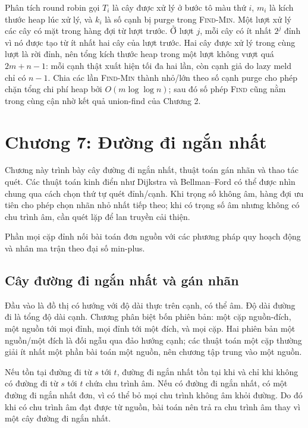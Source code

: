 \documentclass[11pt]{article}
\begin{document}
Phân tích round robin gọi \(T_i\) là cây được xử lý ở bước tô màu thứ \(i\),
\(m_i\) là kích thước heap lúc xử lý, và \(k_i\) là số cạnh bị purge trong
\textsc{Find-Min}. Một lượt xử lý các cây có mặt trong hàng đợi từ lượt trước.
Ở lượt \(j\), mỗi cây có ít nhất \(2^j\) đỉnh vì nó được tạo từ ít nhất hai cây
của lượt trước. Hai cây được xử lý trong cùng lượt là rời đỉnh, nên tổng kích
thước heap trong một lượt không vượt quá \(2m+n-1\): mỗi cạnh thật xuất hiện
tối đa hai lần, còn cạnh giả do lazy meld chỉ có \(n-1\). Chia các lần
\textsc{Find-Min} thành nhỏ/lớn theo số cạnh purge cho phép chặn tổng chi phí
heap bởi \(O(m\log\log n)\); sau đó số phép \textsc{Find} cũng nằm trong cùng
cận nhờ kết quả union-find của Chương 2.

\section{Chương 7: Đường đi ngắn nhất}

Chương này trình bày cây đường đi ngắn nhất, thuật toán gán nhãn và thao tác
quét. Các thuật toán kinh điển như Dijkstra và Bellman--Ford có thể được nhìn
chung qua cách chọn thứ tự quét đỉnh/cạnh. Khi trọng số không âm, hàng đợi ưu
tiên cho phép chọn nhãn nhỏ nhất tiếp theo; khi có trọng số âm nhưng không có
chu trình âm, cần quét lặp để lan truyền cải thiện.

Phần mọi cặp đỉnh nối bài toán đơn nguồn với các phương pháp quy hoạch động
và nhân ma trận theo đại số min-plus.

\subsection*{Cây đường đi ngắn nhất và gán nhãn}

Đầu vào là đồ thị có hướng với độ dài thực trên cạnh, có thể âm. Độ dài đường
đi là tổng độ dài cạnh. Chương phân biệt bốn phiên bản: một cặp nguồn-đích,
một nguồn tới mọi đỉnh, mọi đỉnh tới một đích, và mọi cặp. Hai phiên bản một
nguồn/một đích là đối ngẫu qua đảo hướng cạnh; các thuật toán một cặp thường
giải ít nhất một phần bài toán một nguồn, nên chương tập trung vào một nguồn.

Nếu tồn tại đường đi từ \(s\) tới \(t\), đường đi ngắn nhất tồn tại khi và chỉ khi
không có đường đi từ \(s\) tới \(t\) chứa chu trình âm. Nếu có đường đi ngắn nhất,
có một đường đi ngắn nhất đơn, vì có thể bỏ mọi chu trình không âm khỏi đường.
Do đó khi có chu trình âm đạt được từ nguồn, bài toán nên trả ra chu trình âm
thay vì một cây đường đi ngắn nhất.
\end{document}
